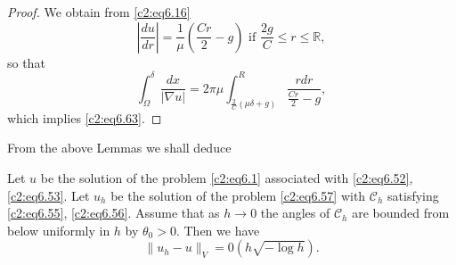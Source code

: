 \begin{proof}
We obtain from \eqref{c2:eq6.16}
$$
\left|\frac{du}{dr}\right| = \frac{1}{\mu} \left(\frac{Cr}{2}-
g\right) \text{ if } 
\frac{2g}{C} \leq r \leq \mathbb{R},  
$$
so that 
$$
\int_\Omega^\delta \frac{dx}{|\nabla u|} = 2 \pi \mu
\int^R_{\frac{2}{C} (\mu \delta + g)} \frac{rdr}{\frac{Cr}{2} - g}, 
$$\pageoriginale 
which implies \eqref{c2:eq6.63}.
\end{proof}

From the above Lemmas we shall deduce 

\begin{theorem}\label{c2:thm6.7}%
Let $u$ be the solution of the problem \eqref{c2:eq6.1} associated
with \eqref{c2:eq6.52}, 
\eqref{c2:eq6.53}. Let $u_h$ be the solution of the problem
\eqref{c2:eq6.57} with 
$\mathscr{C}_h$ satisfying \eqref{c2:eq6.55},
\eqref{c2:eq6.56}. Assume that as $h \to 0$ 
the angles of $\mathscr{C}_h$ are bounded from below uniformly in $h$ 
by $\theta_0 > 0$. Then we have  
\begin{equation}
\parallel u_h - u\parallel_V = 0 (h \sqrt{- \log h}).\tag{6.64}\label{c2:eq6.64} 
\end{equation}
\end{theorem}

